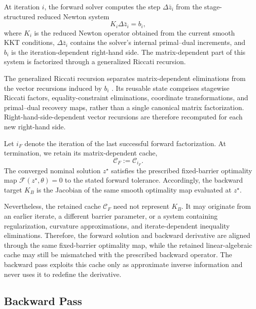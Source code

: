 \documentclass[letterpaper,10pt,conference]{ieeeconf}
\begin{document}
At iteration $i$, the forward solver computes the step
$\Delta\bar z_i$ from the stage-structured reduced Newton system
\begin{equation}
K_i\Delta\bar z_i=b_i,
\label{eq:forward_reduced_system}
\end{equation}
where $K_i$ is the reduced Newton operator obtained from the current
smooth KKT conditions, $\Delta\bar z_i$ contains the solver's internal
primal--dual increments, and $b_i$ is the iteration-dependent
right-hand side. The matrix-dependent part of this system is
factorized through a generalized Riccati recursion.

The generalized Riccati recursion separates matrix-dependent
eliminations from the vector recursions induced by $b_i$
\cite{vanroye2024generalization}. Its reusable state comprises
stagewise Riccati factors, equality-constraint eliminations,
coordinate transformations, and primal--dual recovery maps, rather
than a single canonical matrix factorization. Right-hand-side-dependent
vector recursions are therefore recomputed for each new right-hand side.

Let $i_F$ denote the iteration of the last successful forward
factorization. At termination, we retain its matrix-dependent cache,
\begin{equation}
\mathcal C_F:=\mathcal C_{i_F}.
\label{eq:retained_forward_cache}
\end{equation}
The converged nominal solution $z^\star$ satisfies the prescribed
fixed-barrier optimality map $\mathcal F(z^\star,\theta)=0$ to the
stated forward tolerance. Accordingly, the backward target $K_B$ is
the Jacobian of the same smooth optimality map evaluated at
$z^\star$.

Nevertheless, the retained cache $\mathcal C_F$ need not represent
$K_B$. It may originate from an earlier iterate, a different barrier
parameter, or a system containing regularization, curvature
approximations, and iterate-dependent inequality eliminations.
Therefore, the forward solution and backward derivative are aligned
through the same fixed-barrier optimality map, while the retained
linear-algebraic cache may still be mismatched with the prescribed
backward operator. The backward pass exploits this cache only as
approximate inverse information and never uses it to redefine the
derivative.

\subsection{Backward Pass}
\label{sec:backward_pass}
\end{document}
